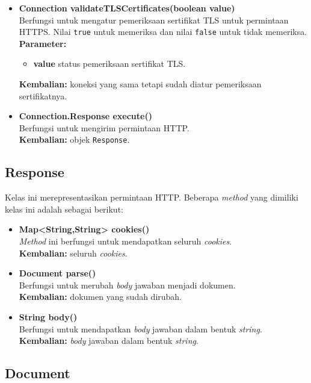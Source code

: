 \begin{itemize}
		\item \textbf{Connection validateTLSCertificates(boolean value)} \\
		Berfungsi untuk mengatur pemeriksaan sertifikat TLS untuk permintaan HTTPS. Nilai \texttt{true} untuk memeriksa dan nilai \texttt{false} untuk tidak memeriksa.\\
		\textbf{Parameter:}
		\begin{itemize}
			\item \textbf{value} status pemeriksaan sertifikat TLS.
		\end{itemize}
		\textbf{Kembalian:} koneksi yang sama tetapi sudah diatur pemeriksaan sertifikatnya.
		
		\item \textbf{Connection.Response execute()} \\
		Berfungsi untuk mengirim permintaan HTTP.\\
		\textbf{Kembalian:} objek \texttt{Response}.	
\end{itemize}

\subsection{Response}

Kelas ini merepresentasikan permintaan HTTP. Beberapa \textit{method} yang dimiliki kelas ini adalah sebagai berikut:
\begin{itemize}
	\item \textbf{Map<String,String> cookies()} \\
		\textit{Method} ini berfungsi untuk mendapatkan seluruh \textit{cookies}. \\
		\textbf{Kembalian:} seluruh \textit{cookies}.	
		
		\item \textbf{Document parse()} \\
		Berfungsi untuk merubah \textit{body} jawaban menjadi dokumen. \\
		\textbf{Kembalian:} dokumen yang sudah dirubah.
		
		\item \textbf{String body()} \\
		Berfungsi untuk mendapatkan \textit{body} jawaban dalam bentuk \textit{string}. \\
		\textbf{Kembalian:} \textit{body} jawaban dalam bentuk \textit{string}.
\end{itemize}

\subsection{Document}

